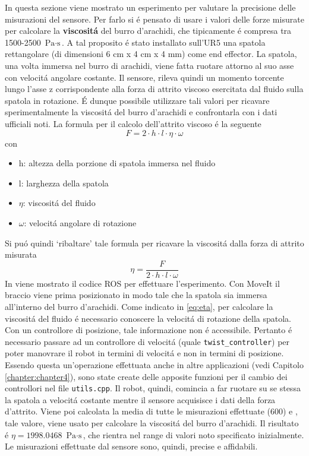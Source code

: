 In questa sezione viene mostrato un esperimento per valutare la precisione delle misurazioni del sensore. 
Per farlo si \'{e} pensato di usare i valori delle forze misurate per calcolare la \textbf{viscosit\'{a}} del burro d'arachidi, 
che tipicamente \'{e} compresa tra 1500-2500 $\text{Pa} \cdot \text{s}$. 
A tal proposito \'{e} stato installato sull'UR5 una spatola rettangolare (di dimensioni 6 cm x 4 cm x 4 mm) come end effector. 
La spatola, una volta immersa nel burro di arachidi, viene fatta ruotare attorno al suo asse con velocit\'{a} angolare 
costante. Il sensore, rileva quindi un momento torcente lungo l'asse z corrispondente alla forza di attrito viscoso esercitata 
dal fluido sulla spatola in rotazione. \'{E} dunque possibile utilizzare tali valori per ricavare sperimentalmente 
la viscosit\'{a} del burro d'arachidi e confrontarla con i dati ufficiali noti. 
La formula per il calcolo dell'attrito viscoso \'{e} la seguente 
\begin{equation*}
    F = 2 \cdot h \cdot l \cdot \eta \cdot \omega
\end{equation*}
con 
\begin{itemize}
    \item h: altezza della porzione di spatola immersa nel fluido
    \item l: larghezza della spatola
    \item $\eta$: viscosit\'{a} del fluido
    \item $\omega$: velocit\'{a} angolare di rotazione
\end{itemize}
Si pu\'{o} quindi `ribaltare' tale formula per ricavare la viscosit\'{a} dalla forza di attrito misurata 
\begin{equation} \label{eq:eta}
    \eta = \frac{F}{2 \cdot h \cdot l \cdot \omega}
\end{equation}
In \cite{viscosity} viene mostrato il codice ROS per effettuare l'esperimento. 
Con MoveIt il braccio viene prima posizionato in modo tale che la spatola sia immersa all'interno del burro d'arachidi. 
Come indicato in \ref{eq:eta}, per calcolare la viscosit\'{a} del fluido \'{e} necessario conoscere 
la velocit\'{a} di rotazione della spatola. Con un controllore di posizione, tale informazione non \'{e} accessibile. 
Pertanto \'{e} necessario passare ad un controllore di velocit\'{a} (quale \verb|twist_controller|) per poter manovrare il robot in 
termini di velocit\'{a} e non in termini di posizione. Essendo questa un'operazione effettuata anche in altre applicazioni (vedi  
Capitolo \ref{chapter:chapter4}), sono state create delle apposite funzioni per il cambio dei controllori nel file \verb|utils.cpp|. 
Il robot, quindi, comincia a far ruotare su se stessa la spatola a velocit\'{a} costante mentre il sensore acquisisce i dati della 
forza d'attrito. 
Viene poi calcolata la media di tutte le misurazioni effettuate (600) e , tale valore, viene usato per calcolare la viscosit\'{a} 
del burro d'arachidi. 
Il risultato \'{e} $\eta = 1998.0468$ $\text{Pa} \cdot \text{s}$, che rientra nel range di valori noto specificato inizialmente. 
Le misurazioni effettuate dal sensore sono, quindi, precise e affidabili.